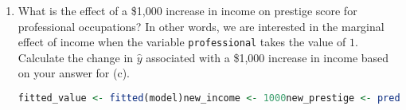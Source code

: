 \documentclass[12pt,letterpaper]{article}
\begin{document}
\begin{enumerate}
		\vspace{0.05cm}	
	\begin{lstlisting}[language=R]
		coefficients(summary(model))["professional"]
	\end{lstlisting}
	
	[1] NA
	
	\item [(f)]
	What is the effect of a \$1,000 increase in income on prestige score for professional occupations? In other words, we are interested in the marginal effect of income when the variable \texttt{professional} takes the value of $1$. Calculate the change in $\hat{y}$ associated with a \$1,000 increase in income based on your answer for (c).
	
	\vspace{0.05cm}
		\begin{lstlisting}[language=R]
		fitted_value <- fitted(model)new_income <- 1000new_prestige <- predict(model, newdata = data.frame(income = new_income, professional = 1))effect <- new_prestige - fitted_valueeffect
	\end{lstlisting}
	

\end{enumerate}
\end{document}
